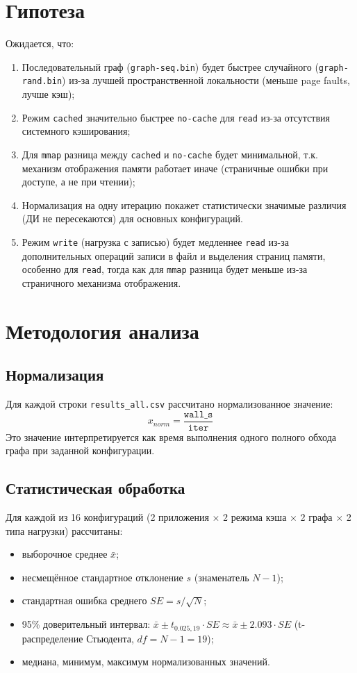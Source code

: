 \documentclass[12pt,a4paper]{article}
\begin{document}
\section{Гипотеза}
Ожидается, что:
\begin{enumerate}
    \item Последовательный граф (\texttt{graph-seq.bin}) будет быстрее случайного (\texttt{graph-rand.bin}) из-за лучшей пространственной локальности (меньше page faults, лучше кэш);
    \item Режим \texttt{cached} значительно быстрее \texttt{no-cache} для \texttt{read} из-за отсутствия системного кэширования;
    \item Для \texttt{mmap} разница между \texttt{cached} и \texttt{no-cache} будет минимальной, т.к. механизм отображения памяти работает иначе (страничные ошибки при доступе, а не при чтении);
    \item Нормализация на одну итерацию покажет статистически значимые различия (ДИ не пересекаются) для основных конфигураций.
    \item Режим \texttt{write} (нагрузка с записью) будет медленнее \texttt{read} из-за дополнительных операций записи в файл и выделения страниц памяти, особенно для \texttt{read}, тогда как для \texttt{mmap} разница будет меньше из-за страничного механизма отображения.
\end{enumerate}

\section{Методология анализа}
\subsection{Нормализация}
Для каждой строки \texttt{results\_all.csv} рассчитано нормализованное значение:
\[
    x_{norm} = \frac{\texttt{wall\_s}}{\texttt{iter}}
\]
Это значение интерпретируется как время выполнения одного полного обхода графа при заданной конфигурации.

\subsection{Статистическая обработка}
Для каждой из 16 конфигураций (2 приложения $\times$ 2 режима кэша $\times$ 2 графа $\times$ 2 типа нагрузки) рассчитаны:
\begin{itemize}
    \item выборочное среднее $\bar{x}$;
    \item несмещённое стандартное отклонение $s$ (знаменатель $N-1$);
    \item стандартная ошибка среднего $SE = s / \sqrt{N}$;
    \item 95\% доверительный интервал: $\bar{x} \pm t_{0.025,19} \cdot SE \approx \bar{x} \pm 2.093 \cdot SE$ (t-распределение Стьюдента, $df = N - 1 = 19$);
    \item медиана, минимум, максимум нормализованных значений.
\end{itemize}
\end{document}
